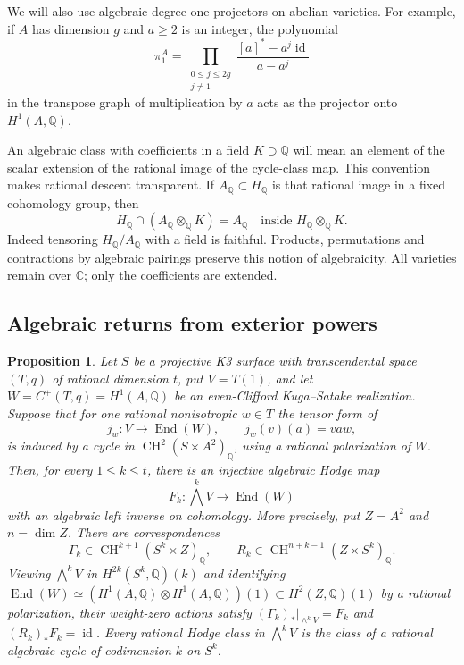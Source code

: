 \documentclass[11pt]{amsart}
\newcommand{\Q}{\mathbb Q}
\newcommand{\C}{\mathbb C}
\DeclareMathOperator{\CH}{CH}
\DeclareMathOperator{\End}{End}
\DeclareMathOperator{\id}{id}
\newtheorem{proposition}[theorem]{Proposition}
\theoremstyle{definition}
\theoremstyle{remark}
\numberwithin{equation}{section}
\begin{document}
We will also use algebraic degree-one projectors on abelian
varieties.  For example, if $A$ has dimension $g$ and $a\geq2$ is an
integer, the polynomial
\[
 \pi_1^A=\prod_{\substack{0\leq j\leq2g\\j\ne1}}
       \frac{[a]^*-a^j\id}{a-a^j}
\]
in the transpose graph of multiplication by $a$ acts as the
projector onto $H^1(A,\Q)$.

An algebraic class with coefficients in a field $K\supset\Q$ will
mean an element of the scalar extension of the rational image of
the cycle-class map.  This convention makes rational descent
transparent.  If $A_{\Q}\subset H_{\Q}$ is that rational image in a
fixed cohomology group, then
\begin{equation}\label{ext:descent}
 H_{\Q}\cap(A_{\Q}\otimes_{\Q}K)=A_{\Q}
 \quad\text{inside }H_{\Q}\otimes_{\Q}K.
\end{equation}
Indeed tensoring $H_{\Q}/A_{\Q}$ with a field is faithful.  Products,
permutations and contractions by algebraic pairings preserve this
notion of algebraicity.  All varieties remain over $\C$; only the
coefficients are extended.

\subsection{Algebraic returns from exterior powers}

\begin{proposition}\label{ext:conditional}
Let $S$ be a projective K3 surface with transcendental space $(T,q)$
of rational dimension $t$, put $V=T(1)$, and let
$W=C^+(T,q)=H^1(A,\Q)$ be an even-Clifford Kuga--Satake realization.
Suppose that for one rational nonisotropic $w\in T$ the tensor form
of
\begin{equation}\label{ext:exact-kappa}
 j_w:V\longrightarrow\End(W),\qquad
 j_w(v)(a)=vaw,
\end{equation}
is induced by a cycle in $\CH^2(S\times A^2)_{\Q}$, using a
rational polarization of $W$.  Then, for every $1\leq k\leq t$,
there is an injective algebraic Hodge map
\[
 F_k:\bigwedge^kV\longrightarrow\End(W)
\]
with an algebraic left inverse on cohomology.  More precisely, put
$Z=A^2$ and $n=\dim Z$.  There are correspondences
\[
 \Gamma_k\in\CH^{k+1}(S^k\times Z)_\Q,\qquad
 R_k\in\CH^{n+k-1}(Z\times S^k)_\Q.
\]
Viewing $\bigwedge^kV$ in $H^{2k}(S^k,\Q)(k)$ and identifying
$\End(W)\simeq(H^1(A,\Q)\otimes H^1(A,\Q))(1)\subset H^2(Z,\Q)(1)$
by a rational polarization, their weight-zero actions satisfy
$(\Gamma_k)_*|_{\wedge^kV}=F_k$ and $(R_k)_*F_k=\id$.
Every rational Hodge class in $\bigwedge^kV$ is the class
of a rational algebraic cycle of codimension $k$ on $S^k$.
\end{proposition}
\end{document}
